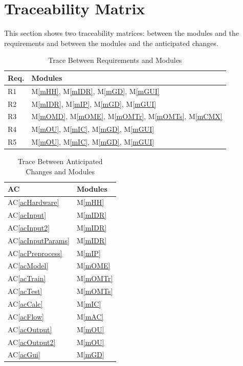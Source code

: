 \documentclass[12pt, titlepage]{article}
\newcommand{\acref}[1]{AC\ref{#1}}
\newcommand{\mref}[1]{M\ref{#1}}
\begin{document}
\section{Traceability Matrix} \label{SecTM}

This section shows two traceability matrices: between the modules and the
requirements and between the modules and the anticipated changes.

\begin{table}[H]
\centering
\begin{tabular}{p{} p{}}
\toprule
\textbf{Req.} & \textbf{Modules}\\
\midrule
R1 & \mref{mHH}, \mref{mIDR}, \mref{mGD}, \mref{mGUI}\\
R2 & \mref{mIDR}, \mref{mIP}, \mref{mGD}, \mref{mGUI}\\
R3 & \mref{mOMD}, \mref{mOME}, \mref{mOMTr}, \mref{mOMTs}, \mref{mCMX}\\
R4 & \mref{mOU}, \mref{mIC}, \mref{mGD}, \mref{mGUI}\\
R5 & \mref{mOU}, \mref{mIC}, \mref{mGD}, \mref{mGUI}\\
\bottomrule
\end{tabular}
\caption{Trace Between Requirements and Modules}
\label{TblRT}
\end{table}

\begin{table}[H]
\centering
\begin{tabular}{p{} p{}}
\toprule
\textbf{AC} & \textbf{Modules}\\
\midrule
\acref{acHardware} & \mref{mHH}\\
\acref{acInput} & \mref{mIDR}\\
\acref{acInput2} & \mref{mIDR}\\
\acref{acInputParams} & \mref{mIDR}\\
\acref{acPreprocess} & \mref{mIP}\\
\acref{acModel} & \mref{mOME}\\
\acref{acTrain} & \mref{mOMTr}\\
\acref{acTest} & \mref{mOMTs}\\
\acref{acCalc} & \mref{mIC}\\
\acref{acFlow} & \mref{mAC}\\
\acref{acOutput} & \mref{mOU}\\
\acref{acOutput2} & \mref{mOU}\\
\acref{acGui} & \mref{mGD}\\
\bottomrule
\end{tabular}
\caption{Trace Between Anticipated Changes and Modules}
\label{TblACT}
\end{table}
\end{document}
